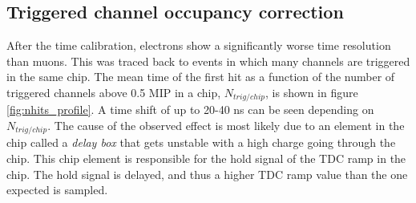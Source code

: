 \documentclass{JINST}
\begin{document}
\subsection{Triggered channel occupancy correction}
\label{sec:NumberTrigger}

After the time calibration, electrons show a significantly worse time resolution than muons. This was traced back to events in which many channels are triggered in the same chip. The mean time of the first hit as a function of the number of triggered channels above 0.5 MIP in a chip, $N_{trig/chip}$, is shown in figure \ref{fig:nhits_profile}. A time shift of up to 20-40 ns can be seen depending on  $N_{trig/chip}$. The cause of the observed effect is most likely due to an element in the chip called a \textit{delay box} that gets unstable with a high charge going through the chip. This chip element is responsible for the hold signal of the TDC ramp in the chip. The hold signal is delayed, and thus a higher TDC ramp value than the one expected is sampled.
\end{document}
